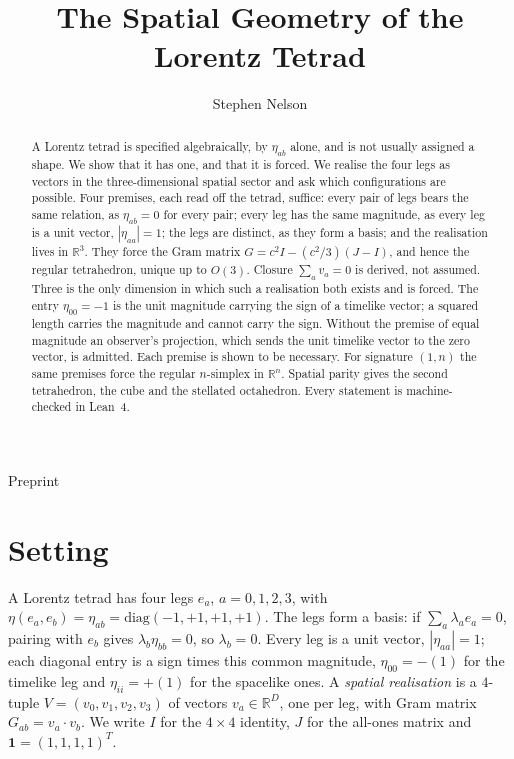 \documentclass[twocolumn]{iopjournal}
\renewcommand{\articletype}[1]{%
  {\vspace*{-8mm}\noindent \Large \sf Preprint}\par
  \vspace*{6mm}\noindent{\scriptsize \sf{\bfseries \MakeUppercase{#1}}}}
\begin{document}
\articletype{Supplementary Material}

\title{The Spatial Geometry of the Lorentz Tetrad}

\author{Stephen Nelson}



\begin{abstract}
A Lorentz tetrad is specified algebraically, by $\eta_{ab}$ alone,
and is not usually assigned a shape. We show that it has one, and that
it is forced. We realise the four legs as vectors in the
three-dimensional spatial sector and ask which configurations are
possible. Four premises, each read off the tetrad, suffice:
every pair of legs bears the same relation, as $\eta_{ab} = 0$ for
every pair; every leg has the same magnitude, as every leg is a unit
vector, $|\eta_{aa}| = 1$; the legs are distinct, as they form a
basis; and the realisation lives in $\mathbb{R}^3$. They force the Gram matrix
$G = c^2 I - (c^2/3)(J - I)$, and hence the regular tetrahedron,
unique up to $O(3)$. Closure $\sum_a v_a = 0$ is derived, not
assumed. Three is the only dimension in which such a realisation
both exists and is forced. The entry $\eta_{00} = -1$ is the unit
magnitude carrying the sign of a timelike vector; a squared length
carries the magnitude and cannot carry the sign. Without the premise
of equal magnitude an observer's projection, which sends the unit
timelike vector to the zero vector, is admitted. Each premise is
shown to be necessary. For signature $(1,n)$ the same premises force
the regular $n$-simplex in $\mathbb{R}^n$. Spatial parity gives the
second tetrahedron, the cube and the stellated octahedron. Every
statement is machine-checked in Lean~4.
\end{abstract}



\section*{Setting}

A Lorentz tetrad has four legs $e_a$, $a = 0,1,2,3$, with
$\eta(e_a, e_b) = \eta_{ab} = \mathrm{diag}(-1,+1,+1,+1)$.
The legs form a basis: if $\sum_a \lambda_a e_a = 0$, pairing with
$e_b$ gives $\lambda_b \eta_{bb} = 0$, so $\lambda_b = 0$. Every leg
is a unit vector, $|\eta_{aa}| = 1$; each diagonal entry is a sign
times this common magnitude, $\eta_{00} = -(1)$ for the timelike leg
and $\eta_{ii} = +(1)$ for the spacelike ones. A
\emph{spatial realisation} is a $4$-tuple
$V = (v_0, v_1, v_2, v_3)$ of vectors $v_a \in \mathbb{R}^D$, one
per leg, with Gram matrix $G_{ab} = v_a \cdot v_b$. We write $I$ for
the $4 \times 4$ identity, $J$ for the all-ones matrix and
$\mathbf{1} = (1,1,1,1)^T$.
\end{document}

